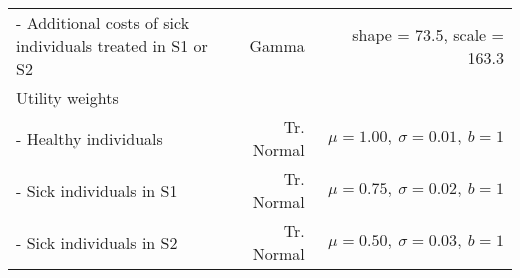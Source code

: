 \documentclass[
]{article}
\begin{document}
\begin{longtable}[]{@{}lrr@{}}
\begin{minipage}[t]{0.32\columnwidth}\raggedright
- Additional costs of sick individuals treated in S1 or S2\strut
\end{minipage} & \begin{minipage}[t]{0.17\columnwidth}\raggedleft
Gamma\strut
\end{minipage} & \begin{minipage}[t]{0.42\columnwidth}\raggedleft
shape = 73.5, scale = 163.3\strut
\end{minipage}\tabularnewline
\begin{minipage}[t]{0.32\columnwidth}\raggedright
Utility weights\strut
\end{minipage} & \begin{minipage}[t]{0.17\columnwidth}\raggedleft
\strut
\end{minipage} & \begin{minipage}[t]{0.42\columnwidth}\raggedleft
\strut
\end{minipage}\tabularnewline
\begin{minipage}[t]{0.32\columnwidth}\raggedright
- Healthy individuals\strut
\end{minipage} & \begin{minipage}[t]{0.17\columnwidth}\raggedleft
Tr. Normal\strut
\end{minipage} & \begin{minipage}[t]{0.42\columnwidth}\raggedleft
\(\mu = 1.00, \ \sigma = 0.01, \ b = 1\)\strut
\end{minipage}\tabularnewline
\begin{minipage}[t]{0.32\columnwidth}\raggedright
- Sick individuals in S1\strut
\end{minipage} & \begin{minipage}[t]{0.17\columnwidth}\raggedleft
Tr. Normal\strut
\end{minipage} & \begin{minipage}[t]{0.42\columnwidth}\raggedleft
\(\mu = 0.75, \ \sigma = 0.02, \ b = 1\)\strut
\end{minipage}\tabularnewline
\begin{minipage}[t]{0.32\columnwidth}\raggedright
- Sick individuals in S2\strut
\end{minipage} & \begin{minipage}[t]{0.17\columnwidth}\raggedleft
Tr. Normal\strut
\end{minipage} & \begin{minipage}[t]{0.42\columnwidth}\raggedleft
\(\mu = 0.50, \ \sigma = 0.03, \ b = 1\)\strut

\end{minipage}
\end{longtable}
\end{document}
